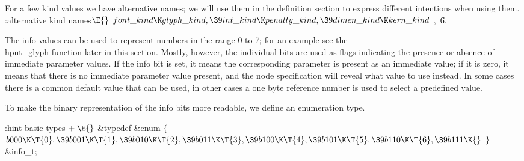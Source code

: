 
For a few kind values we have
alternative names; we will use them in the definition section
to express different intentions when using them.
\Y\B\4:alternative kind names\X${}\E{}$\6
$\index{font kind+\\{font\_kind}}\\{font\_kind}\K\index{glyph kind+\\{glyph\_kind}}\\{glyph\_kind},\39\index{int kind+\\{int\_kind}}\\{int\_kind}\K\index{penalty kind+\\{penalty\_kind}}\\{penalty\_kind},\39\index{dimen kind+\\{dimen\_kind}}\\{dimen\_kind}\K\index{kern kind+\\{kern\_kind}}\\{kern\_kind}$ $,{}$\6
\hbox{{}}
\U6.\Y
\fi


The info values can be used to represent numbers in the range 0 to 7; for an example
see the \\{hput\_glyph} function later in this section.
Mostly, however, the individual bits are used as flags indicating the presence
or absence of immediate parameter values. If the info bit is set, it
means the corresponding parameter is present as an immediate value; if it
is zero, it means that there is no immediate parameter value present, and
the node specification will reveal what value to use instead.
In some cases there is a common default value that can be used, in other
cases a one byte reference number is used to select a predefined value.

To make the binary
representation of the info bits more readable, we define an
enumeration type.

\Y\B\4:hint basic types\X${}\mathrel+\E{}$\6
\&{typedef} \&{enum} ${}\{{}$\5
\1${}\\{b000}\K\T{0},\39\\{b001}\K\T{1},\39\\{b010}\K\T{2},\39\\{b011}\K\T{3},\39\\{b100}\K\T{4},\39\\{b101}\K\T{5},\39\\{b110}\K\T{6},\39\\{b111}\K{}$\5
\2${}\}{}$ \&{info\_t};
\Y
\fi

